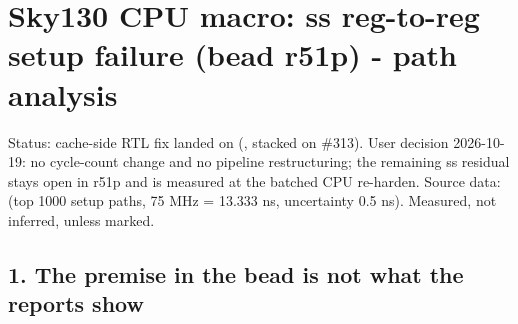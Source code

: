 \section{Sky130 CPU macro: ss reg-to-reg setup failure (bead r51p) -
path analysis}\label{cr:defect:sky130-cpu-ss-setup-r51p}

\begin{record}

Status: cache-side RTL fix landed on  (, stacked on \#313). User decision 2026-10-19: no cycle-count
change and no pipeline restructuring; the remaining ss residual stays
open in r51p and is measured at the batched CPU re-harden. Source data:
(top 1000 setup paths, 75 MHz = 13.333 ns, uncertainty 0.5 ns).
Measured, not inferred, unless marked.

\end{record}

\subsection{1. The premise in the bead is not what the reports show}\label{cr:defect:sky130-cpu-ss-setup-r51p:1-the-premise-in-the-bead-is-not-what-the-reports-show}

